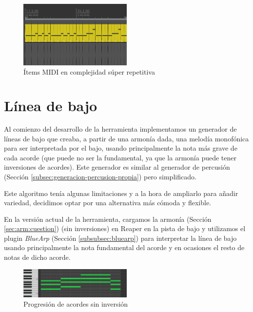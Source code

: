 \begin{itemize}
\begin{figure}[h]
    \centering
    \includegraphics[width = 0.5\textwidth]{Imagenes/Bitmap/ComplejidadSuperRepetitiva.png}
    \caption{Ítems MIDI en complejidad súper repetitiva}
    \label{fig:ComplejidadSuperRepetitiva}
\end{figure}

\end{itemize}

\section{Línea de bajo}\label{sec:lineas-de-bajo}
Al comienzo del desarrollo de la herramienta implementamos un generador de líneas de bajo que creaba, a partir de una armonía dada, una melodía monofónica para ser interpretada por el bajo, usando principalmente la nota más grave de cada acorde (que puede no ser la fundamental, ya que la armonía puede tener inversiones de acordes). Este generador es similar al generador de percusión (Sección \ref{subsec:generacion-percusion-propia}) pero simplificado.

Este algoritmo tenía algunas limitaciones y a la hora de ampliarlo para añadir variedad, decidimos optar por una alternativa más cómoda y flexible.

En la versión actual de la herramienta, cargamos la armonía (Sección \ref{sec:arm:cuestion}) (sin inversiones) en Reaper en la pista de bajo y utilizamos el plugin \textit{BlueArp} (Sección \ref{subsubsec:bluearp}) para interpretar la línea de bajo usando principalmente la nota fundamental del acorde y en ocasiones el resto de notas de dicho acorde.


\begin{figure}[h]
    \centering
    \includegraphics[width = 0.5\textwidth]{Imagenes/Bitmap/LineaDeBajo1.png}
    \caption{Progresión de acordes sin inversión}
    \label{fig:LineaDeBajoAcordes}
\end{figure}


